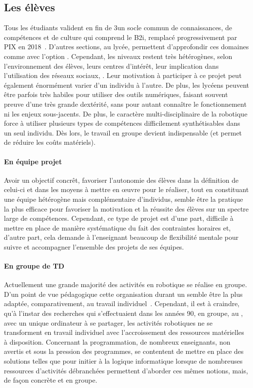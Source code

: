     \subsection{Les élèves}
        Tous les étudiants valident en fin de 3\ieme un socle commun de connaissances, de compétences et de culture qui comprend le B2i, remplacé progressivement par PIX en 2018~.%
        D'autres sections, au lycée, permettent d'approfondir ces domaines comme avec l'option .
        Cependant, les niveaux restent très hétérogènes, selon l’environnement des élèves, leurs centres d’intérêt, leur implication dans l’utilisation des réseaux sociaux, \etc. Leur motivation à participer à ce projet peut également énormément varier d’un individu à l’autre. De plus, les lycéens peuvent être parfois très habiles pour utiliser des outils numériques, faisant souvent preuve d’une très grande dextérité, sans pour autant connaître le fonctionnement ni les enjeux sous-jacents. De plus, le caractère multi-disciplinaire de la robotique force à utiliser plusieurs types de compétences difficilement synthétisables dans un seul individu. Dès lors, le travail en groupe devient indispensable (et permet de réduire les coûts matériels).
        \paragraph{En équipe projet}
            Avoir un objectif concrêt, favoriser l'autonomie des élèves dans la définition de celui-ci et dans les moyens à mettre en œuvre pour le réaliser, tout en constituant une équipe hétérogène mais complémentaire d'individus, semble être la pratique la plus efficace pour favoriser la motivation et la réussite des élèves sur un spectre large de compétences. Cependant, ce type de projet est d'une part, difficile à mettre en place de manière systématique du fait des contraintes horaires et, d'autre part, cela demande à l'enseignant beaucoup de flexibilité mentale pour suivre et accompagner l'ensemble des projets de ses équipes.
        \paragraph{En groupe de TD}
            Actuellement une grande majorité des activités en robotique se réalise en groupe. D'un point de vue pédagogique cette organisation durant un  semble être la plus adaptée, comparativement, au travail individuel~. Cependant, il est à craindre, qu'à l'instar des recherches qui s'effectuaient dans les années 90, en groupe, au , avec un unique ordinateur à se partager, les activités robotiques ne se transforment en travail individuel avec l'accroissement des ressources matérielles à disposition.
            Concernant la programmation, de nombreux enseignants, non avertis et sous la pression des programmes, se contentent de mettre en place des solutions telles que  pour initier à la logique informatique lorsque de nombreuses ressources d'activités débranchées permettent d'aborder ces mêmes notions, mais, de façon concrète et en groupe.
